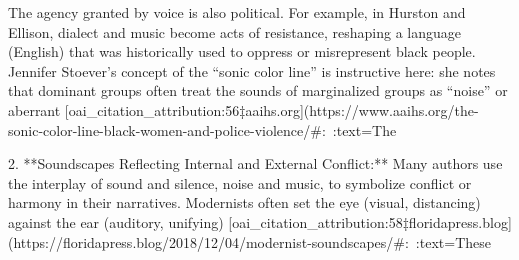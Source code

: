 \documentclass[12pt]{report}
\begin{document}
   The agency granted by voice is also political. For example, in Hurston and Ellison, dialect and music become acts of resistance, reshaping a language (English) that was historically used to oppress or misrepresent black people. Jennifer Stoever’s concept of the “sonic color line” is instructive here: she notes that dominant groups often treat the sounds of marginalized groups as “noise” or aberrant [oai_citation_attribution:56‡aaihs.org](https://www.aaihs.org/the-sonic-color-line-black-women-and-police-violence/#:~:text=The%

2. **Soundscapes Reflecting Internal and External Conflict:** Many authors use the interplay of sound and silence, noise and music, to symbolize conflict or harmony in their narratives. Modernists often set the eye (visual, distancing) against the ear (auditory, unifying) [oai_citation_attribution:58‡floridapress.blog](https://floridapress.blog/2018/12/04/modernist-soundscapes/#:~:text=These%
\end{document}
